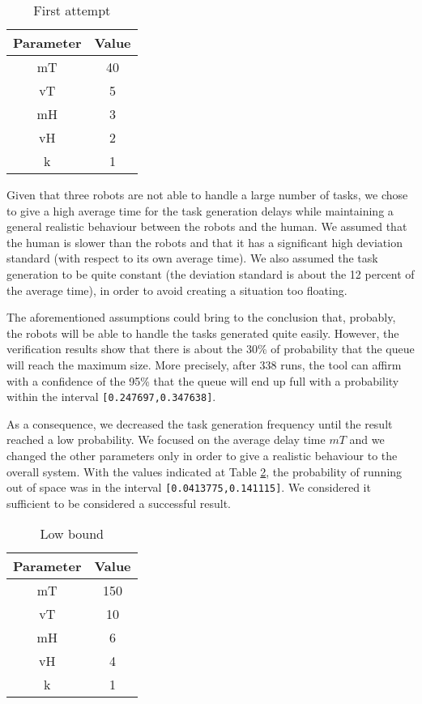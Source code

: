 \begin{table}[h]
\centering
    \begin{tabular}{|c c|} 
        \hline
        Parameter & Value \\ [0.5ex] 
        \hline\hline
        mT & 40 \\
        vT & 5 \\
        mH & 3 \\
        vH & 2 \\
        k & 1 \\ [0.5ex] 
        \hline
    \end{tabular}
    \caption{First attempt}
    \label{tab:firstattempt}
\end{table}

Given that three robots are not able to handle a large number of tasks, we chose to give a high average time for the task generation delays while maintaining a general realistic behaviour between the robots and the human. We assumed that the human is slower than the robots and that it has a significant high deviation standard (with respect to its own average time). We also assumed the task generation to be quite constant (the deviation standard is about the 12 percent of the average time), in order to avoid creating a situation too floating.

The aforementioned assumptions could bring to the conclusion that, probably, the robots will be able to handle the tasks generated quite easily. However, the verification results show that there is about the 30\% of probability that the queue will reach the maximum size. More precisely, after 338 runs, the tool can affirm with a confidence of the 95\% that the queue will end up full with a probability within the interval \texttt{[0.247697,0.347638]}.

As a consequence, we decreased the task generation frequency until the result reached a low probability. We focused on the average delay time $mT$ and we changed the other parameters only in order to give a realistic behaviour to the overall system. With the values indicated at Table \ref{tab:lowbound}, the probability of running out of space was in the interval \texttt{[0.0413775,0.141115]}. We considered it sufficient to be considered a successful result.

\begin{table}[h]
    \centering
        \begin{tabular}{|c c|} 
            \hline
            Parameter & Value \\ [0.5ex] 
            \hline\hline
            mT & 150 \\
            vT & 10 \\
            mH & 6 \\
            vH & 4 \\
            k & 1 \\ [0.5ex] 
            \hline
        \end{tabular}
        \caption{Low bound}
        \label{tab:lowbound}
\end{table}

